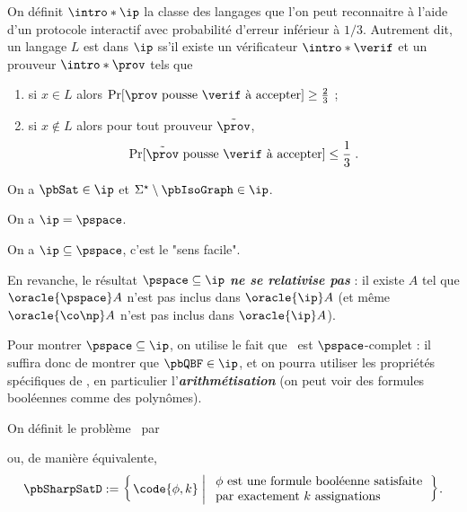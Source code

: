 \documentclass[./main]{subfiles}
\begin{document}
  \begin{defn}
    On définit $\intro*\ip$ la classe des langages que l'on peut reconnaitre à
    l'aide d'un protocole interactif avec probabilité d'erreur inférieur à
    $1/3$. Autrement dit, un langage $L$ est dans $\ip$ ss'il existe un
    vérificateur $\intro*\verif$ et un prouveur $\intro*\prov$ tels que
     \begin{enumerate}
      \item si $x \in L$ alors $\Pr[\text{$\prov$ pousse $\verif$ à accepter}] \ge  \frac{2}{3}$ ;
      \item si $x \not\in L$ alors pour tout prouveur $\tilde{\prov}$, 
        \[
          \Pr[\text{$\tilde{\prov}$ pousse $\verif$ à accepter}] \le \frac{1}{3} \;
        .\]
    \end{enumerate}
  \end{defn}

  \begin{exm}
    On a $\pbSat \in \ip$ et $\Sigma^\star \setminus \pbIsoGraph \in \ip$.
  \end{exm}

  \begin{thm}
    On a $\ip = \pspace$.
  \end{thm}

  \begin{rmk}
    On a $\ip \subseteq \pspace$, c'est le "sens facile".

    En revanche, le résultat $\pspace \subseteq \ip$ \textit{\textbf{ne se
    relativise pas}} : il existe $A$ tel que $\oracle{\pspace} A$ n'est pas
    inclus dans $\oracle{\ip} A$ (et même~$\oracle{\conp} A$ n'est pas inclus
    dans $\oracle{\ip} A$).
  \end{rmk}

  Pour montrer $\pspace \subseteq \ip$, on utilise le fait que \pbQBF\ est
  $\pspace$-complet : il suffira donc de montrer que $\pbQBF \in \ip$, et on
  pourra utiliser les propriétés spécifiques de \pbQBF, en particulier
  l'\textit{\textbf{arithmétisation}} (on peut voir des formules booléennes
  comme des polynômes).

  \begin{defn}
    On définit le problème \pbSharpSatD\ par 

    \showSharpSatD

    ou, de manière équivalente,
    \[
      \pbSharpSatD := \mleft\{\,\code{\phi, k} \;\middle|\; 
        \begin{array}{l}
          \text{$\phi$ est une formule booléenne satisfaite}\\
          \text{par exactement $k$ assignations}
        \end{array}
      \,\mright\} 
    .\] 
  \end{defn}
\end{document}

